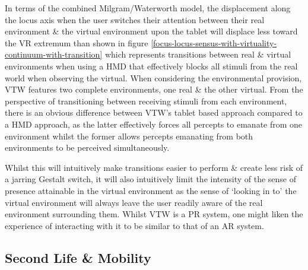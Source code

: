 In terms of the combined Milgram/Waterworth model, the displacement along the locus axis when the user switches their attention between their real environment \& the virtual environment upon the tablet will displace less toward the VR extremum than shown in figure \ref{focus-locus-sensus-with-virtuality-continuum-with-transition} which represents transitions between real \& virtual environments when using a HMD that effectively blocks all stimuli from the real world when observing the virtual. When considering the environmental provision, VTW features two complete environments, one real \& the other virtual. From the perspective of transitioning between receiving stimuli from each environment, there is an obvious difference between VTW's tablet based approach compared to a HMD approach, as the latter effectively forces all percepts to emanate from one environment whilst the former allows percepts emanating from both environments to be perceived simultaneously.

Whilst this will intuitively make transitions easier to perform \& create less risk of a jarring Gestalt switch, it will also intuitively limit the intensity of the sense of presence attainable in the virtual environment as the sense of `looking in to' the virtual environment will always leave the user readily aware of the real environment surrounding them. Whilst VTW is a PR system, one might liken the experience of interacting with it to be similar to that of an AR system.




\subsection{Second Life \& Mobility}

\newcommand{\LumiyaFootnote}{\footnote{\url{https://play.google.com/store/apps/details?id=com.lumiyaviewer.lumiya&hl=en_GB}}}

\newcommand{\WindpadFootnote}{\footnote{\url{http://www.msi.com/product/windpad/WindPad-110W.html}}}

